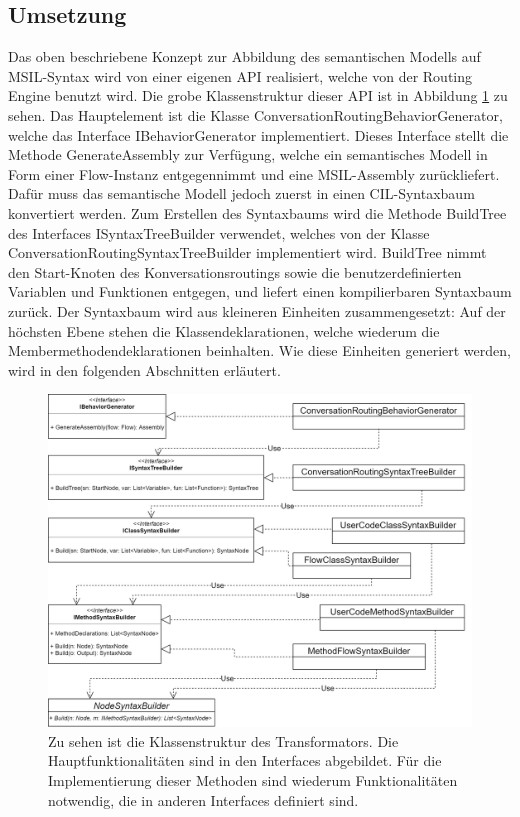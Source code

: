 \subsection{Umsetzung}
Das oben beschriebene Konzept zur Abbildung des semantischen Modells auf MSIL-Syntax wird von einer eigenen API realisiert, welche von der Routing Engine benutzt wird. Die grobe Klassenstruktur dieser API ist in Abbildung \ref{fig:UML:Transformator} zu sehen. Das Hauptelement ist die Klasse ConversationRoutingBehaviorGenerator, welche das Interface IBehaviorGenerator implementiert. Dieses Interface stellt die Methode GenerateAssembly zur Verfügung, welche ein semantisches Modell in Form einer Flow-Instanz entgegennimmt und eine MSIL-Assembly zurückliefert.  Dafür muss das semantische Modell jedoch zuerst in einen CIL-Syntaxbaum konvertiert werden. Zum Erstellen des Syntaxbaums wird die Methode BuildTree des Interfaces ISyntaxTreeBuilder verwendet, welches von der Klasse ConversationRoutingSyntaxTreeBuilder implementiert wird. BuildTree nimmt den Start-Knoten des Konversationsroutings sowie die benutzerdefinierten Variablen und Funktionen entgegen, und liefert einen kompilierbaren Syntaxbaum zurück. Der Syntaxbaum wird aus kleineren Einheiten zusammengesetzt: Auf der höchsten Ebene stehen die Klassendeklarationen, welche wiederum die Membermethodendeklarationen beinhalten. Wie diese Einheiten generiert werden, wird in den folgenden Abschnitten erläutert.

\begin{figure} %
	\centering
		\includegraphics[width=\textwidth]{img/TransformatorUML.png}
	\caption[Klassenstruktur des Transformators]{Zu sehen ist die Klassenstruktur des Transformators. Die Hauptfunktionalitäten sind in den Interfaces abgebildet. Für die Implementierung dieser Methoden sind wiederum Funktionalitäten notwendig, die in anderen Interfaces definiert sind.}
	\label{fig:UML:Transformator}
\end{figure}
 

